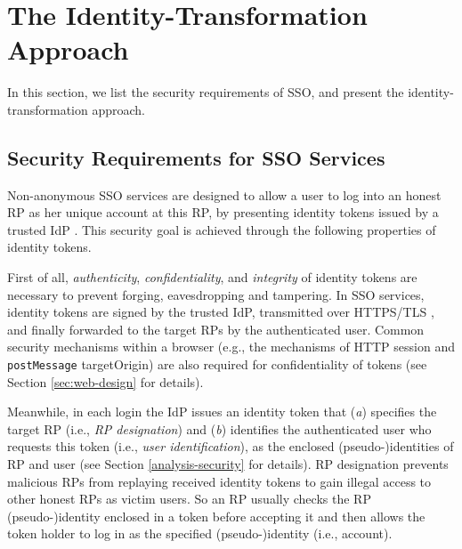 \section{The Identity-Transformation Approach}
\label{sec:challenge}

In this section,
    we list the security requirements of SSO,
        and present the identity-transformation approach.

\subsection{Security Requirements for SSO Services}
\label{subsec:basicrequirements}

Non-anonymous SSO services are designed to allow a user to log into an honest RP as her unique account at this RP, %
by presenting identity tokens issued by a trusted IdP   \cite{OpenIDConnect,rfc6749,SAML,SAMLIdentifier,NIST2017draft}.
This security goal is achieved through the following properties of identity tokens.

First of all, \emph{authenticity}, \emph{confidentiality}, and \emph{integrity} of identity tokens are necessary to prevent forging, eavesdropping and tampering.
In SSO services, identity tokens are signed by the trusted IdP,
    transmitted over HTTPS/TLS \cite{OpenIDConnect, rfc6749, SAML},
    and finally forwarded to the target RPs by the authenticated user.
Common security mechanisms within a browser (e.g., the mechanisms of HTTP session and \verb+postMessage+ targetOrigin)
are also required for confidentiality of tokens \cite{GoogleIdIntegrate,de2014oauth,FettKS14,BrowserID} (see Section \ref{sec:web-design} for details).

Meanwhile, in each login the IdP issues an identity token that (\emph{a}) specifies the target RP (i.e., \emph{RP designation}) and (\emph{b}) identifies the authenticated user who requests this token (i.e., \emph{user identification}),
        as the enclosed (pseudo-)identities of RP and user \cite{OpenIDConnect,rfc6749,SAML} (see Section \ref{analysis-security} for details).
RP designation prevents malicious RPs from replaying received identity tokens to gain illegal access to other honest RPs as victim users.
So an RP usually checks the RP (pseudo-)identity enclosed in a token before accepting it 
\cite{OpenIDConnect,BrowserID,SPRESSO,NIST2017draft,POIDC,save-flow,up-sso,miso}
 and then allows the token holder to log in as the specified (pseudo-)identity (i.e., account).

